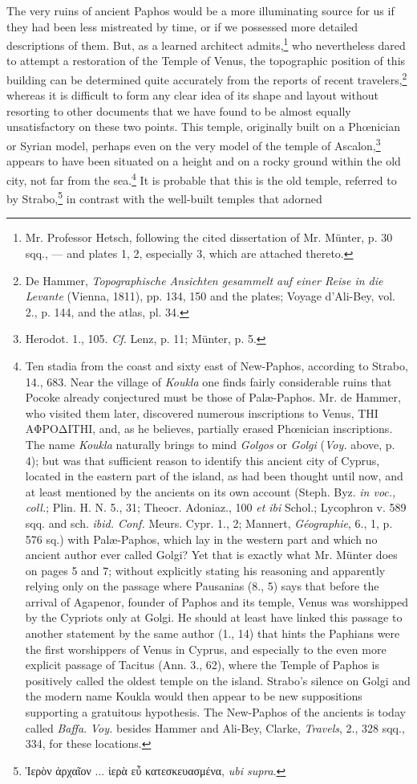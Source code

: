 \documentclass[a4paper, 11pt, oneside, polutonikogreek, english]{article}
\begin{document}
The very ruins of ancient Paphos would be a more illuminating source for us if they had been less mistreated by time, or if we possessed more detailed descriptions of them. But, as a learned architect admits,\footnote{Mr. Professor Hetsch, following the cited dissertation of Mr. Münter, p. 30 sqq., --- and plates 1, 2, especially 3, which are attached thereto.} who nevertheless dared to attempt a restoration of the Temple of Venus, the topographic position of this building can be determined quite accurately from the reports of recent travelers,\footnote{De Hammer, \emph{Topographische Ansichten gesammelt auf einer Reise in die Levante} (Vienna, 1811), pp. 134, 150 and the plates; Voyage d'Ali-Bey, vol. 2., p. 144, and the atlas, pl. 34.} whereas it is difficult to form any clear idea of its shape and layout without resorting to other documents that we have found to be almost equally unsatisfactory on these two points. This temple, originally built on a Phœnician or Syrian model, perhaps even on the very model of the temple of Ascalon,\footnote{Herodot. 1., 105. \emph{Cf.} Lenz, p. 11; Münter, p. 5.} appears to have been situated on a height and on a rocky ground within the old city, not far from the sea.\footnote{Ten stadia from the coast and sixty east of New-Paphos, according to Strabo, 14., 683. Near the village of \emph{Koukla} one finds fairly considerable ruins that Pocoke already conjectured must be those of Palæ-Paphos. Mr. de Hammer, who visited them later, discovered numerous inscriptions to Venus, ΤΗΙ ΑΦΡΟΔΙΤΗΙ, and, as he believes, partially erased Phœnician inscriptions. The name \emph{Koukla} naturally brings to mind \emph{Golgos} or \emph{Golgi} (\emph{Voy.} above, p. 4); but was that sufficient reason to identify this ancient city of Cyprus, located in the eastern part of the island, as had been thought until now, and at least mentioned by the ancients on its own account (Steph. Byz. \emph{in voc., coll.}; Plin. H. N. 5., 31; Theocr. Adoniaz., 100 \emph{et ibi} Schol.; Lycophron v. 589 sqq. and sch. \emph{ibid. Conf.} Meurs. Cypr. 1., 2; Mannert, \emph{Géographie}, 6., 1, p. 576 sq.) with Palæ-Paphos, which lay in the western part and which no ancient author ever called Golgi? Yet that is exactly what Mr. Münter does on pages 5 and 7; without explicitly stating his reasoning and apparently relying only on the passage where Pausanias (8., 5) says that before the arrival of Agapenor, founder of Paphos and its temple, Venus was worshipped by the Cypriots only at Golgi. He should at least have linked this passage to another statement by the same author (1., 14) that hints the Paphians were the first worshippers of Venus in Cyprus, and especially to the even more explicit passage of Tacitus (Ann. 3., 62), where the Temple of Paphos is positively called the oldest temple on the island. Strabo's silence on Golgi and the modern name Koukla would then appear to be new suppositions supporting a gratuitous hypothesis. The New-Paphos of the ancients is today called \emph{Baffa}. \emph{Voy.} besides Hammer and Ali-Bey, Clarke, \emph{Travels}, 2., 328 sqq., 334, for these locations.} It is probable that this is the old temple, referred to by Strabo,\footnote{Ἱερὸν ἀρχαῖον ... ἱερὰ εὖ κατεσκευασμένα, \emph{ubi supra}.} in contrast with the well-built temples that adorned 
\end{document}
